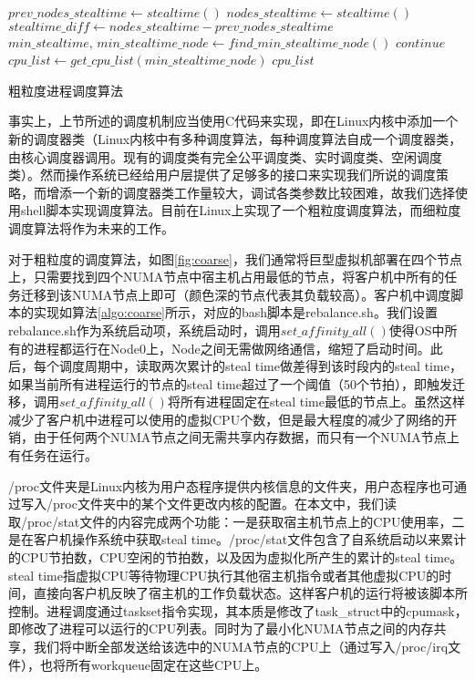 \begin{algorithm}[h]
\begin{algorithmic}[1]
\State
{}
\State
{}
\State
{}
\EndFor
\EndFunction
\State
{}
\State $prev\_nodes\_stealtime \gets stealtime()$
\State
{}
\State $nodes\_stealtime \gets stealtime()$
\State $stealtime\_diff \gets nodes\_stealtime - prev\_nodes\_stealtime$
\State $min\_stealtime,\,min\_stealtime\_node \gets find\_min\_stealtime\_node()$
\State $continue$
\EndIf
\State $cpu\_list \gets get\_cpu\_list(min\_stealtime\_node)$
\State
{} {$cpu\_list$}
\EndWhile
\end{algorithmic}
\caption{粗粒度进程调度算法}
\label{algo:coarse}
\end{algorithm}
事实上，上节所述的调度机制应当使用C代码来实现，即在Linux内核中添加一个新的调度器类（Linux内核中有多种调度算法，每种调度算法自成一个调度器类，由核心调度器调用。现有的调度类有完全公平调度类、实时调度类、空闲调度类）。然而操作系统已经给用户层提供了足够多的接口来实现我们所说的调度策略，而增添一个新的调度器类工作量较大，调试各类参数比较困难，故我们选择使用shell脚本实现调度算法。目前在Linux上实现了一个粗粒度调度算法，而细粒度调度算法将作为未来的工作。

对于粗粒度的调度算法，如图\ref{fig:coarse}，我们通常将巨型虚拟机部署在四个节点上，只需要找到四个NUMA节点中宿主机占用最低的节点，将客户机中所有的任务迁移到该NUMA节点上即可（颜色深的节点代表其负载较高）。客户机中调度脚本的实现如算法\ref{algo:coarse}所示，对应的bash脚本是rebalance.sh。我们设置rebalance.sh作为系统启动项，系统启动时，调用$set\_affinity\_all()$使得OS中所有的进程都运行在Node0上，Node之间无需做网络通信，缩短了启动时间。此后，每个调度周期中，读取两次累计的steal time做差得到该时段内的steal time，如果当前所有进程运行的节点的steal time超过了一个阈值（50个节拍），即触发迁移，调用$set\_affinity\_all()$将所有进程固定在steal time最低的节点上。虽然这样减少了客户机中进程可以使用的虚拟CPU个数，但是最大程度的减少了网络的开销，由于任何两个NUMA节点之间无需共享内存数据，而只有一个NUMA节点上有任务在运行。

/proc文件夹是Linux内核为用户态程序提供内核信息的文件夹，用户态程序也可通过写入/proc文件夹中的某个文件更改内核的配置。在本文中，我们读取/proc/stat文件的内容完成两个功能：一是获取宿主机节点上的CPU使用率，二是在客户机操作系统中获取steal time。/proc/stat文件包含了自系统启动以来累计的CPU节拍数，CPU空闲的节拍数，以及因为虚拟化所产生的累计的steal time。steal time指虚拟CPU等待物理CPU执行其他宿主机指令或者其他虚拟CPU的时间，直接向客户机反映了宿主机的工作负载状态。这样客户机的运行将被该脚本所控制。进程调度通过taskset指令实现，其本质是修改了task\_struct中的cpumask，即修改了进程可以运行的CPU列表。同时为了最小化NUMA节点之间的内存共享，我们将中断全部发送给该选中的NUMA节点的CPU上（通过写入/proc/irq文件），也将所有workqueue固定在这些CPU上。

